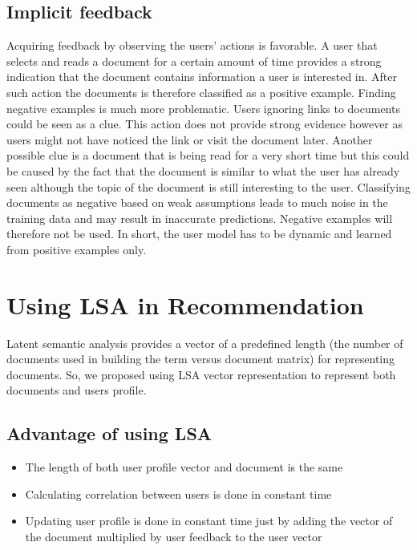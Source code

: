 \subsection{Implicit feedback}
Acquiring feedback by observing the users’ actions is favorable. A user that selects and reads a document for a certain amount of time provides a strong indication that the document contains information a user is interested in. After such action the documents is therefore classified as a positive example. Finding negative examples is much more problematic. Users ignoring links to documents could be seen as a clue. This action does not provide strong evidence however as users might not have noticed the link or visit the document later. Another possible clue is a document that is being read for a very short time but this could be caused by the fact that the document is similar to what the user has already seen although the topic of the document is still interesting to the user. Classifying documents as negative based on weak assumptions leads to much noise in the training data and may result in inaccurate predictions. Negative examples will therefore not be used. In short, the user model has to be dynamic and learned from positive examples only.
\section{Using LSA in Recommendation}
Latent semantic analysis provides a vector of a predefined length (the number of documents used in building the term versus document matrix) for representing documents.
So, we proposed using LSA vector representation to represent both documents and users profile.
\subsection{Advantage of using LSA}
\begin{itemize}
\item  The length of both user profile vector and document is the same
\item  Calculating correlation between users is done in constant time
\item  Updating user profile is done in constant time just by adding the vector of the document multiplied by user feedback to the user vector
\end{itemize}









